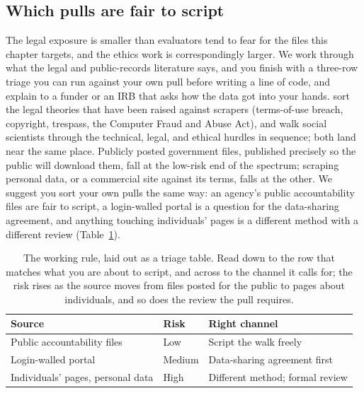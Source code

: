 \documentclass[
    a4paper,
    fontsize=10pt,
    twoside=true,
    numbers=noenddot,
]{kaobook}
\begin{document}
\subsection{Which pulls are fair to script}\label{sec:ch04-legalrisk}
The legal exposure is smaller than evaluators tend to fear for the files this chapter targets, and the ethics work is correspondingly larger. We work through what the legal and public-records literature says, and you finish with a three-row triage you can run against your own pull before writing a line of code, and explain to a funder or an IRB that asks how the data got into your hands. \textcite{krotov2020legality} sort the legal theories that have been raised against scrapers (terms-of-use breach, copyright, trespass, the Computer Fraud and Abuse Act), and \textcite{luscombe2022scraping} walk social scientists through the technical, legal, and ethical hurdles in sequence; both land near the same place. Publicly posted government files, published precisely so the public will download them, fall at the low-risk end of the spectrum; scraping personal data, or a commercial site against its terms, falls at the other. We suggest you sort your own pulls the same way: an agency's public accountability files are fair to script, a login-walled portal is a question for the data-sharing agreement, and anything touching individuals' pages is a different method with a different review (Table~\ref{tab:ch04-viz-risk}).

\begin{table}[htbp]
\centering
\caption[Which channel for which source]{The working rule, laid out as a triage table. Read down to the row that matches what you are
about to script, and across to the channel it calls for; the risk rises
as the source moves from files posted for the public to pages about
individuals, and so does the review the pull requires.}
\label{tab:ch04-viz-risk}
\begin{tabular}{@{}p{4.2cm}p{1.8cm}p{8.8cm}@{}}
\toprule
Source & Risk & Right channel \\
\midrule
Public accountability files & Low & Script the walk freely \\
Login-walled portal & Medium & Data-sharing agreement first \\
Individuals' pages, personal data & High & Different method; formal review \\
\bottomrule
\end{tabular}
\end{table}
\end{document}
